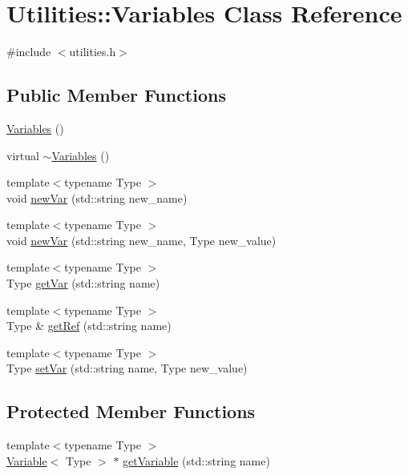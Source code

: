 \hypertarget{classUtilities_1_1Variables}{}\section{Utilities\+:\+:Variables Class Reference}
\label{classUtilities_1_1Variables}


{\ttfamily \#include $<$utilities.\+h$>$}

\subsection*{Public Member Functions}
\begin{DoxyCompactItemize}
\item 
\hyperlink{classUtilities_1_1Variables_a60ebf236218fbefc48cb35e6dcabb2d6}{Variables} ()
\item 
virtual \hyperlink{classUtilities_1_1Variables_a4a67d0d360d70d7a928be6fe48c6753b}{$\sim$\+Variables} ()
\item 
{\footnotesize template$<$typename Type $>$ }\\void \hyperlink{classUtilities_1_1Variables_a7763fc000f45ef3956d61fdf2f783130}{new\+Var} (std\+::string new\+\_\+name)
\item 
{\footnotesize template$<$typename Type $>$ }\\void \hyperlink{classUtilities_1_1Variables_a67029a527f5810a298fc6538b6a634d2}{new\+Var} (std\+::string new\+\_\+name, Type new\+\_\+value)
\item 
{\footnotesize template$<$typename Type $>$ }\\Type \hyperlink{classUtilities_1_1Variables_adff493c2ea6249294a35204fd6b3f852}{get\+Var} (std\+::string name)
\item 
{\footnotesize template$<$typename Type $>$ }\\Type \& \hyperlink{classUtilities_1_1Variables_a94ddcf8aa7cd6c60b8e611c006bc3e6d}{get\+Ref} (std\+::string name)
\item 
{\footnotesize template$<$typename Type $>$ }\\Type \hyperlink{classUtilities_1_1Variables_ad5f59cff15b008435763a81bdac8bcf3}{set\+Var} (std\+::string name, Type new\+\_\+value)
\end{DoxyCompactItemize}
\subsection*{Protected Member Functions}
\begin{DoxyCompactItemize}
\item 
{\footnotesize template$<$typename Type $>$ }\\\hyperlink{classUtilities_1_1Variable}{Variable}$<$ Type $>$ $\ast$ \hyperlink{classUtilities_1_1Variables_ad02aa6b33771710e786c7b881928a5fd}{get\+Variable} (std\+::string name)
\end{DoxyCompactItemize}
